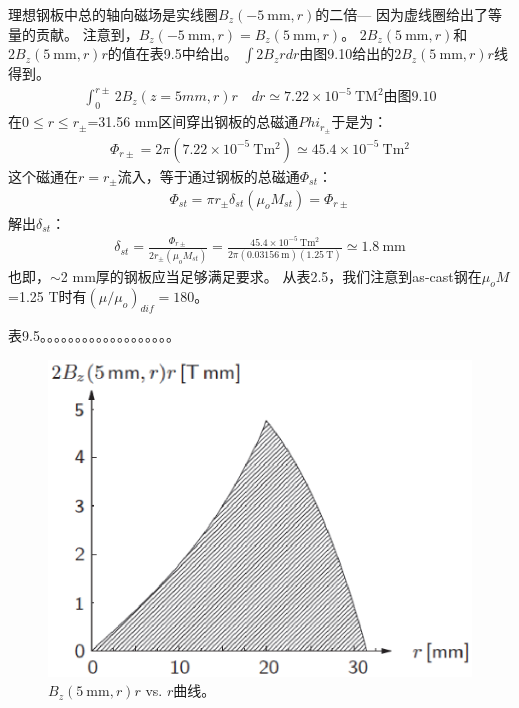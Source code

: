 理想钢板中总的轴向磁场是实线圈$B_z(-5\ \mathrm{mm},r)$的二倍---
因为虚线圈给出了等量的贡献。
注意到，$B_z(-5\ \mathrm{mm},r)=B_z(5\ \mathrm{mm},r)$。
$2 B_z(5\ \mathrm{mm},r)$和$2 B_z(5\ \mathrm{mm},r)r$的值在表9.5中给出。
$\int 2B_z rdr$由图9.10给出的$2B_z(5\ \mathrm{mm},r)r$线得到。
\begin{align*}%
\int_{0}^{r\pm}2B_{z}(z=5mm,r)r\quad dr\simeq 7.22\times10^{-5}\ \mathrm{TM^{2}}\mbox{由图9.10}
\end{align*}
在$0\le r\le r_{\pm}$=31.56 mm区间穿出钢板的总磁通$Phi_{r_{\pm}}$于是为：
\begin{align*}%
\Phi_{r\pm}=2\pi(7.22\times 10^{-5}\ \mathrm{Tm^{2}})\simeq 45.4\times 10^{-5}\ \mathrm{Tm^{2}}
\end{align*}
这个磁通在$r=r_{\pm}$流入，等于通过钢板的总磁通$\Phi_{st}$：
\begin{align*}%
\Phi_{st}=\pi r_{\pm}\delta_{st}(\mu_{o}M_{st})=\Phi_{r\pm}
\end{align*}
解出$\delta_{st}$：
\begin{align*}%
\delta_{st}=\frac{\Phi_{r\pm}}{2r_{\pm}(\mu_{o}M_{st})}=\frac{45.4\times 10^{-5}\ \mathrm{Tm^{2}}}{2\pi(0.03156\ \mathrm{m})(1.25\ \mathrm{T})}\simeq 1.8\ \mathrm{mm}
\end{align*}
也即，$\sim$2 mm厚的钢板应当足够满足要求。
从表2.5，我们注意到as-cast钢在$\mu_o M$=1.25 T时有$(\mu/\mu_o)_{dif}=180$。

表9.5。。。。。。。。。。。。。。。。。。。

\begin{figure}
	\centering
	\includegraphics[scale=0.5]{chpt9/figs/fig9.10.eps}
	\caption{$B_z(5\ \mathrm{mm},r)r$ vs. $r$曲线。}
\end{figure}

